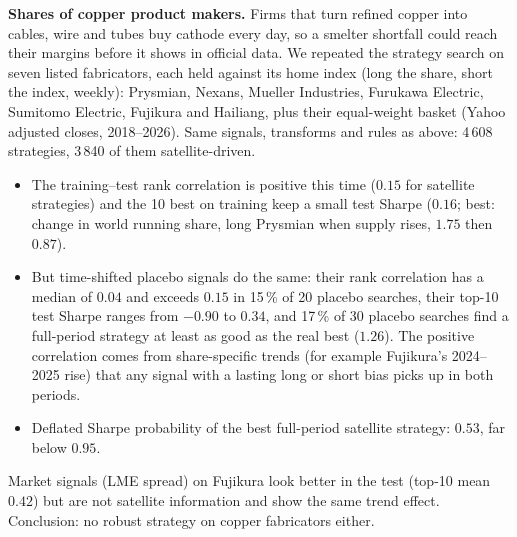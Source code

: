 \documentclass[10pt,a4paper]{article}
\begin{document}
\textbf{Shares of copper product makers.} Firms that turn refined copper into cables, wire and tubes buy cathode every day, so a smelter shortfall could reach their margins before it shows in official data. We repeated the strategy search on seven listed fabricators, each held against its home index (long the share, short the index, weekly): Prysmian, Nexans, Mueller Industries, Furukawa Electric, Sumitomo Electric, Fujikura and Hailiang, plus their equal-weight basket (Yahoo adjusted closes, 2018--2026). Same signals, transforms and rules as above: 4\,608 strategies, 3\,840 of them satellite-driven.
\begin{itemize}[leftmargin=1.2em]
  \item The training--test rank correlation is positive this time ($0.15$ for satellite strategies) and the 10 best on training keep a small test Sharpe ($0.16$; best: change in world running share, long Prysmian when supply rises, $1.75$ then $0.87$).
  \item But time-shifted placebo signals do the same: their rank correlation has a median of $0.04$ and exceeds $0.15$ in 15\,\% of 20 placebo searches, their top-10 test Sharpe ranges from $-0.90$ to $0.34$, and 17\,\% of 30 placebo searches find a full-period strategy at least as good as the real best ($1.26$). The positive correlation comes from share-specific trends (for example Fujikura's 2024--2025 rise) that any signal with a lasting long or short bias picks up in both periods.
  \item Deflated Sharpe probability of the best full-period satellite strategy: $0.53$, far below $0.95$.
\end{itemize}
Market signals (LME spread) on Fujikura look better in the test (top-10 mean $0.42$) but are not satellite information and show the same trend effect. Conclusion: no robust strategy on copper fabricators either.
\end{document}
